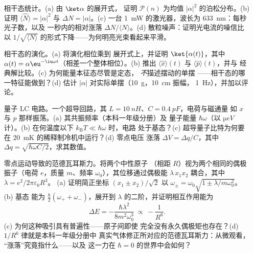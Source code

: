 \begin{exercise}[$\star\star$]\label{exo:b3:harmonic-oscillator:7}
相干态统计。(a) 由 $\ket\alpha$ 的展开式，
证明 $\mathcal P(n)$ 为均值 $|\alpha|^2$ 的泊松分布。(b) 证明
$\langle\hat N\rangle = |\alpha|^2$ 与 $\Delta N = |\alpha|$。(c) 一台
\qty{1}{mW} 的激光器，波长为 \qty{633}{nm}：每秒光子数，以及
一秒内的相对涨落 $\Delta N/\langle N\rangle$。(d)
散粒噪声：证明光电流的噪信比以
$1/\sqrt{\langle N\rangle}$ 的形式下降——为何明亮光束看起来平滑。
\end{exercise}

\begin{exercise}[$\star\star$]\label{exo:b3:harmonic-oscillator:8}
相干态的演化。(a) 将演化相位乘到
展开式上，并证明 $\ket{\alpha(t)}$，其中 $\alpha(t) =
\alpha\eu^{-\iu\omega t}$（相差一个整体相位）。(b) 推出
$\langle\hat x\rangle(t)$ 与 $\langle\hat p\rangle(t)$，并与
经典解比较。(c) 为何能量本征态尽管是定态，
\emph{不}描述摆动的单摆
——相干态的哪一特征能做到？(d) 估计 $|\alpha|$
对实际单摆（\qty{10}{g}，\qty{10}{cm} 振幅，
\qty{1}{Hz}），并加以评论。
\end{exercise}

\begin{exercise}[$\star\star$]\label{exo:b3:harmonic-oscillator:9}
量子 LC 电路。一个超导回路，其 $L =
\qty{10}{nH}$、$C = \qty{0.4}{pF}$，电荷与磁通量
如 $x$ 与 $p$ 那样振荡。(a) 其共振频率（本科一年级分册）及
量子能量 $\hbar\omega$（以 $\unit{\micro eV}$ 计）。(b) 在何温度以下
$k_{\text{B}}T \ll \hbar\omega$ 时，电路
处于基态？(c) 超导量子比特为何要在
\qty{20}{mK} 的稀释制冷机中运行？(d) 零点电压
涨落 $\Delta V = \Delta q/C$，其中 $\Delta q =
\sqrt{\hbar\omega C/2}$，求其数值。
\end{exercise}

\begin{exercise}[$\star\star\star$]\label{exo:b3:harmonic-oscillator:10}
零点运动导致的范德瓦耳斯力。将两个中性原子
（相距 $R$）视为两个相同的偶极振子（电荷 $e$，质量
$m$、频率 $\omega_0$），其位移通过偶极能
$\lambda\,x_1x_2$ 耦合，其中 $\lambda = e^2/2\pi\varepsilon_0R^3$。
(a) 证明简正坐标 $(x_1 \pm x_2)/\sqrt2$ 以
$\omega_\pm = \omega_0\sqrt{1 \pm \lambda/m\omega_0^2}$。(b) 基态
能为 $\tfrac\hbar2(\omega_+ + \omega_-)$，展开到
$\lambda$ 的二阶，并证明相互作用能为
\[
\Delta E = -\frac{\hbar\lambda^2}{8m^2\omega_0^3}
\ \propto\ -\frac{1}{R^6} .
\]
(c) 为何这种吸引具有普遍性——原子间即使
完全没有永久偶极矩也存在？(d) $1/R^6$ 律就是本科一年级分册中
真实气体修正所对应的范德瓦耳斯力：从微观看，
“涨落”究竟指什么——以及
这一力在 $\hbar = 0$ 的世界中会如何？
\end{exercise}

